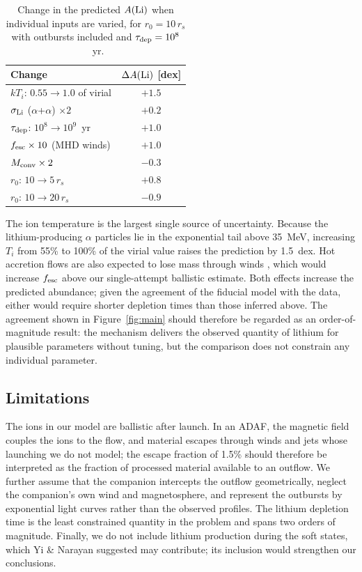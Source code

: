 \documentclass[twocolumn,showpacs,preprintnumbers,amsmath,amssymb]{revtex4}
\begin{document}
\begin{table}[t]
\caption{\label{tab:sens} Change in the predicted $A({\rm Li})$ when individual inputs are varied, for $r_0=10\,r_s$ with outbursts included and $\tau_{\rm dep} = 10^8$~yr.}
\begin{ruledtabular}
\begin{tabular}{lc}
Change & $\Delta A({\rm Li})$ [dex] \\
\hline
$kT_i$: $0.55 \rightarrow 1.0$ of virial & $+1.5$ \\
$\sigma_{\rm Li}$ ($\alpha$+$\alpha$) $\times 2$ & $+0.2$ \\
$\tau_{\rm dep}$: $10^{8}\rightarrow10^{9}$~yr & $+1.0$ \\
$f_{\rm esc}\times 10$ (MHD winds) & $+1.0$ \\
$M_{\rm conv}\times 2$ & $-0.3$ \\
$r_0$: $10 \rightarrow 5\,r_s$ & $+0.8$ \\
$r_0$: $10 \rightarrow 20\,r_s$ & $-0.9$ \\
\end{tabular}
\end{ruledtabular}
\end{table}

The ion temperature is the largest single source of uncertainty. Because the lithium-producing $\alpha$ particles lie in the exponential tail above 35~MeV, increasing $T_i$ from 55\% to 100\% of the virial value raises the prediction by 1.5~dex. Hot accretion flows are also expected to lose mass through winds \cite{YuanNarayan_2014}, which would increase $f_{\rm esc}$ above our single-attempt ballistic estimate. Both effects increase the predicted abundance; given the agreement of the fiducial model with the data, either would require shorter depletion times than those inferred above. The agreement shown in Figure~\ref{fig:main} should therefore be regarded as an order-of-magnitude result: the mechanism delivers the observed quantity of lithium for plausible parameters without tuning, but the comparison does not constrain any individual parameter.

\subsection{Limitations}

The ions in our model are ballistic after launch. In an ADAF, the magnetic field couples the ions to the flow, and material escapes through winds and jets whose launching we do not model; the escape fraction of 1.5\% should therefore be interpreted as the fraction of processed material available to an outflow. We further assume that the companion intercepts the outflow geometrically, neglect the companion's own wind and magnetosphere, and represent the outbursts by exponential light curves rather than the observed profiles. The lithium depletion time is the least constrained quantity in the problem and spans two orders of magnitude. Finally, we do not include lithium production during the soft states, which Yi \& Narayan \cite{YiNarayan1997} suggested may contribute; its inclusion would strengthen our conclusions.
\end{document}
